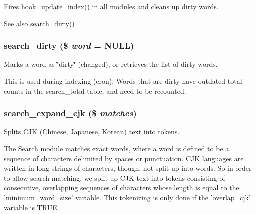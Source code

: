 Fires \hyperlink{group__search_ga23d6f6642bd53c4f033f10e9c1b12d43}{hook\_\-update\_\-index()} in all modules and cleans up dirty words.

\begin{DoxySeeAlso}{See also}
\hyperlink{search_8module_ab872d5ac0d09e2de39d856606092ed02}{search\_\-dirty()} 
\end{DoxySeeAlso}
\hypertarget{search_8module_ab872d5ac0d09e2de39d856606092ed02}{
\subsubsection[{search\_\-dirty}]{\setlength{\rightskip}{0pt plus 5cm}search\_\-dirty (\$ {\em word} = {\ttfamily NULL})}}
\label{search_8module_ab872d5ac0d09e2de39d856606092ed02}
Marks a word as \char`\"{}dirty\char`\"{} (changed), or retrieves the list of dirty words.

This is used during indexing (cron). Words that are dirty have outdated total counts in the search\_\-total table, and need to be recounted. \hypertarget{search_8module_a7088ffdfda833c7047b38f470a806a24}{
\subsubsection[{search\_\-expand\_\-cjk}]{\setlength{\rightskip}{0pt plus 5cm}search\_\-expand\_\-cjk (\$ {\em matches})}}
\label{search_8module_a7088ffdfda833c7047b38f470a806a24}
Splits CJK (Chinese, Japanese, Korean) text into tokens.

The Search module matches exact words, where a word is defined to be a sequence of characters delimited by spaces or punctuation. CJK languages are written in long strings of characters, though, not split up into words. So in order to allow search matching, we split up CJK text into tokens consisting of consecutive, overlapping sequences of characters whose length is equal to the 'minimum\_\-word\_\-size' variable. This tokenizing is only done if the 'overlap\_\-cjk' variable is TRUE.


